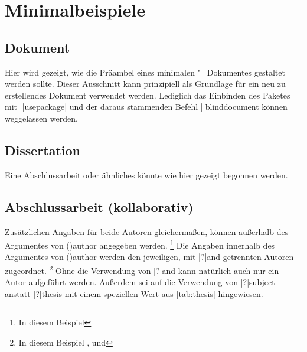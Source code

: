 \chapter{%
  Minimalbeispiele%
  \label{sec:exmpl}%
}
\section{%
  Dokument%
}
%
Hier wird gezeigt, wie die Präambel eines minimalen "=Dokumentes 
gestaltet werden sollte. Dieser Ausschnitt kann prinzipiell als Grundlage für 
ein neu zu erstellendes Dokument verwendet werden. Lediglich das Einbinden des 
Paketes  mit \Macro||{usepackage|} und 
der daraus stammenden Befehl \Macro||{blinddocument} können weggelassen werden.



\section{%
  Dissertation%
  \label{sec:exmpl:dissertation}%
}
%
Eine Abschlussarbeit oder ähnliches könnte wie hier gezeigt begonnen werden.



\section{%
  Abschlussarbeit (kollaborativ)%
  \label{sec:exmpl:thesis}%
}
%
Zusätzlichen Angaben für beide Autoren gleichermaßen, können außerhalb des 
Argumentes von \Macro(){author} angegeben werden.%
\footnote{In diesem Beispiel }
Die Angaben innerhalb des Argumentes von \Macro(){author} 
werden den jeweiligen, mit \Macro|?|{and} getrennten Autoren zugeordnet.%
\footnote{%
  In diesem Beispiel ,  und 
}
Ohne die Verwendung von \Macro|?|{and} kann natürlich auch nur ein Autor 
aufgeführt werden. Außerdem sei auf die Verwendung von \Macro|?|{subject} 
anstatt \Macro|?|{thesis} mit einem speziellen Wert aus \autoref{tab:thesis} 
hingewiesen.



